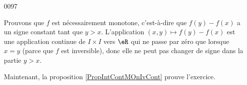 
\begin{corrige}{0097}

Prouvons que $f$ est nécessairement monotone, c'est-à-dire que $f(y)-f(x)$ a un signe constant tant que $y>x$. L'application $(x,y)\mapsto f(y)-f(x)$ est une application continue de $I\times I$ vers $\eR$ qui ne passe par zéro que lorsque $x=y$ (parce que $f$ est inversible), donc elle ne peut pas changer de signe dans la partie $y>x$.

Maintenant, la proposition \ref{PropIntContMOnIvCont} prouve l'exercice.

\end{corrige}
